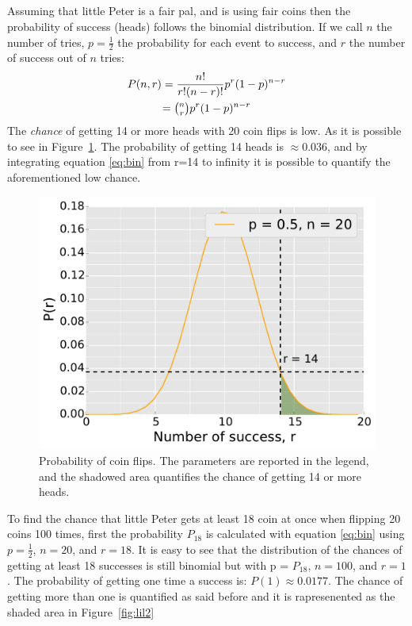 \documentclass[twocolumn]{article}
\begin{document}
	\subsection{} %
	\label{sub:}
	Assuming that little Peter is a fair pal, and is using fair coins then the probability of success (heads) follows the binomial distribution.
	If we call $n$ the number of tries, $p= \frac{1}{2}$ the probability for each event to success, and $r$ the number of success out of $n$ tries: 
	\begin{multline}
	\label{eq:bin}
		P (n,r) = \frac{n!}{r!(n-r)!} p ^ r (1-p)^{n-r} \\ 
		 = \tbinom n r p ^ r (1-p)^{n-r}
	\end{multline}
	The \emph{chance} of getting 14 or more heads with 20 coin flips is low. As it is possible to see in Figure~\ref{fig:lil}. The probability of getting 14 heads is $\approx 0.036$, and by integrating equation \ref{eq:bin} from r=14 to infinity it is possible to quantify the aforementioned low chance.
	\begin{figure}[h]
		\begin{center}
			\includegraphics[width=.4\textwidth]{fig/lil.pdf}
		\end{center}
		\caption{Probability of coin flips. The parameters are reported in the legend, and the shadowed area quantifies the chance of getting 14 or more heads.}
		\label{fig:lil}
	\end{figure}


	To find the chance that little Peter gets at least 18 coin at once when flipping 20 coins 100 times, first the probability $P_{18}$ is calculated with equation \ref{eq:bin} using $p= \frac{1}{2}$, $n=20$, and $r=18$.
	It is easy to see that the distribution of the chances of getting at least 18 successes is still binomial but with p = $P_{18}$, $n=100$, and $r=1$.
	The probability of getting one time a success is: $P(1) \approx 0.0177$. The chance of getting more than one is quantified as said before and it is rapresenented as the shaded area in Figure~\ref{fig:lil2}
\end{document}
